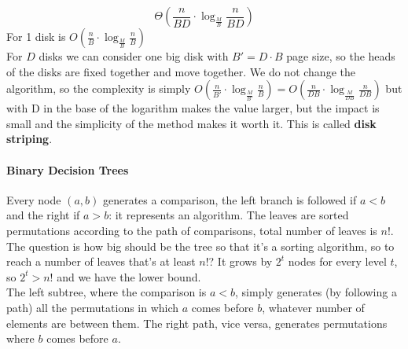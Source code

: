 \documentclass[10pt]{report}
\begin{document}
$$\Theta\left(\frac{n}{BD}\cdot\log_{\frac{M}{B}}\frac{n}{BD}\right)$$
For 1 disk is $O(\frac{n}{B}\cdot\log_{\frac{M}{B}}\frac{n}{B})$\\
For $D$ disks we can consider one big disk with $B' = D\cdot B$ page size, so the heads of the disks are fixed together and move together. We do not change the algorithm, so the complexity is simply $O(\frac{n}{B'}\cdot\log_{\frac{M}{B'}}\frac{n}{B}) = O(\frac{n}{DB}\cdot\log_{\frac{M}{DB}}\frac{n}{DB})$ but with D in the base of the logarithm makes the value larger, but the impact is small and the simplicity of the method makes it worth it. This is called \textbf{disk striping}.
\paragraph{Binary Decision Trees} Every node $(a,b)$ generates a comparison, the left branch is followed if $a<b$ and the right if $a>b$: it represents an algorithm. The leaves are sorted permutations according to the path of comparisons, total number of leaves is $n!$. The question is how big should be the tree so that it's a sorting algorithm, so to reach a number of leaves that's at least $n!$? It grows by $2^t$ nodes for every level $t$, so $2^t > n!$ and we have the lower bound.\\
The left subtree, where the comparison is $a < b$, simply generates (by following a path) all the permutations in which $a$ comes before $b$, whatever number of elements are between them. The right path, vice versa, generates permutations where $b$ comes before $a$.
\end{document}
